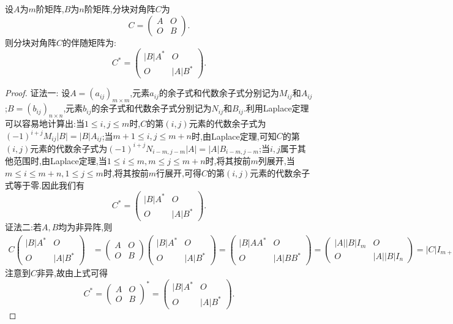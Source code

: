 \documentclass[../../main.tex]{subfiles}
\begin{document}
\begin{proposition}[分块矩阵的伴随矩阵]\label{proposition:分块矩阵的伴随矩阵}
设\(A\)为\(m\)阶矩阵,\(B\)为\(n\)阶矩阵,分块对角阵\(C\)为
\[
C = 
\begin{pmatrix}
A & O \\
O & B
\end{pmatrix}.
\]
则分块对角阵$C$的伴随矩阵为:
\[
C^* = 
\begin{pmatrix}
|B|A^* & O \\
O & |A|B^*
\end{pmatrix}.
\]
\end{proposition}
\begin{proof}
{\color{blue}证法一:}
设\(A = (a_{ij})_{m\times m}\),元素\(a_{ij}\)的余子式和代数余子式分别记为\(M_{ij}\)和\(A_{ij}\);\(B = (b_{ij})_{n\times n}\),元素\(b_{ij}\)的余子式和代数余子式分别记为\(N_{ij}\)和\(B_{ij}\).利用Laplace定理可以容易地计算出:当\(1 \leq i, j \leq m\)时,\(C\)的第\((i, j)\)元素的代数余子式为\((-1)^{i + j}M_{ij}|B| = |B|A_{ij}\);当\(m + 1 \leq i, j \leq m + n\)时,由Laplace定理,可知\(C\)的第\((i, j)\)元素的代数余子式为\((-1)^{i + j}N_{i - m, j - m}|A| = |A|B_{i - m, j - m}\);当\(i, j\)属于其他范围时,由Laplace定理,当$1\leq i\leq m,m\leq j\leq m+n$时,将其按前$m$列展开,当$m\leq i\leq m+n,1\leq j\leq m$时,将其按前$m$行展开,可得\(C\)的第\((i, j)\)元素的代数余子式等于零.因此我们有
\[
C^* = 
\begin{pmatrix}
|B|A^* & O \\
O & |A|B^*
\end{pmatrix}.
\]
{\color{blue}证法二:}若\(A,B\)均为非异阵,则
\begin{align*}
C\begin{pmatrix}
|B|A^* & O\\
O & |A|B^*
\end{pmatrix}&=\begin{pmatrix}
A & O\\
O & B
\end{pmatrix}\begin{pmatrix}
|B|A^* & O\\
O & |A|B^*
\end{pmatrix}
=\begin{pmatrix}
|B|AA^* & O\\
O & |A|BB^*
\end{pmatrix}=\begin{pmatrix}
|A||B|I_m & O\\
O & |A||B|I_n
\end{pmatrix}
=|C|I_{m + n}=CC^*,
\end{align*}
注意到\(C\)非异,故由上式可得
\[
C^*=\begin{pmatrix}
A & O\\
O & B
\end{pmatrix}^*=\begin{pmatrix}
|B|A^* & O\\
O & |A|B^*
\end{pmatrix}.
\]


\end{proof}
\end{document}
